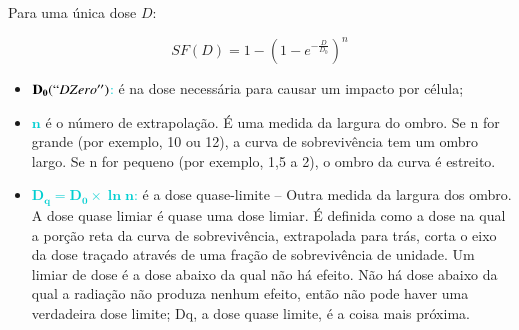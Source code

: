 \documentclass[11pt,a4paper]{article}
\newcounter{exemplo}
\begin{document}
	Para uma única dose $D$:

	\begin{equation}
		SF(D) = 1 - \left(1 - e ^{- \frac{D}{D_0}}\right)^n
	\end{equation}

	\begin{exemplo}[onde,]
		\begin{itemize}
			\item \textcolor{DarkTurquoise}{$\mathbf{D_0}(``D Zero'')$:}  é na dose necessária para causar um impacto por célula;
			\item \textcolor{DarkTurquoise}{$\mathbf{n}$} é o número de extrapolação. É uma medida da largura do ombro. Se n for grande (por exemplo, 10 ou 12), a curva de sobrevivência tem um ombro largo. Se n for pequeno (por exemplo, 1,5 a 2), o ombro da curva é estreito. 
			\item \textcolor{DarkTurquoise}{$\mathbf{D_q = D_0 \times \ln n}$:} é a dose quase-limite -- Outra medida da largura dos ombro. A dose quase limiar é quase uma dose limiar. É definida como a dose na qual a porção reta da curva de sobrevivência, extrapolada para trás, corta o eixo da dose traçado através de uma fração de sobrevivência de unidade. Um limiar de dose é a dose abaixo da qual não há efeito. Não há dose abaixo da qual a radiação não produza nenhum efeito, então não pode haver uma verdadeira dose limite; Dq, a dose quase limite, é a coisa mais próxima.
		\end{itemize}
	\end{exemplo}
\end{document}
